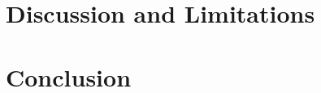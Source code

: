 \documentclass[11pt,a4paper]{article}
\newcommand{\model}{AgroNet}     %
\begin{document}

\section{Discussion and Limitations}

\section{Conclusion}




\end{document}
